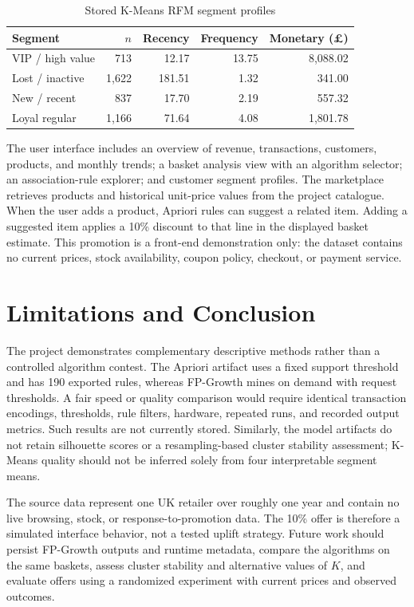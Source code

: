 \documentclass[10pt,conference]{IEEEtran}
\begin{document}
\begin{table}[t]
\centering
\caption{Stored K-Means RFM segment profiles}
\label{tab:segments}
\small
\begin{tabular}{lrrrr}
\toprule
Segment & $n$ & Recency & Frequency & Monetary (\pounds)\\
\midrule
VIP / high value & 713 & 12.17 & 13.75 & 8,088.02\\
Lost / inactive & 1,622 & 181.51 & 1.32 & 341.00\\
New / recent & 837 & 17.70 & 2.19 & 557.32\\
Loyal regular & 1,166 & 71.64 & 4.08 & 1,801.78\\
\bottomrule
\end{tabular}
\end{table}

The user interface includes an overview of revenue, transactions, customers, products, and monthly trends; a basket analysis view with an algorithm selector; an association-rule explorer; and customer segment profiles. The marketplace retrieves products and historical unit-price values from the project catalogue. When the user adds a product, Apriori rules can suggest a related item. Adding a suggested item applies a 10\% discount to that line in the displayed basket estimate. This promotion is a front-end demonstration only: the dataset contains no current prices, stock availability, coupon policy, checkout, or payment service.

\section{Limitations and Conclusion}
The project demonstrates complementary descriptive methods rather than a controlled algorithm contest. The Apriori artifact uses a fixed support threshold and has 190 exported rules, whereas FP-Growth mines on demand with request thresholds. A fair speed or quality comparison would require identical transaction encodings, thresholds, rule filters, hardware, repeated runs, and recorded output metrics. Such results are not currently stored. Similarly, the model artifacts do not retain silhouette scores or a resampling-based cluster stability assessment; K-Means quality should not be inferred solely from four interpretable segment means.

The source data represent one UK retailer over roughly one year and contain no live browsing, stock, or response-to-promotion data. The 10\% offer is therefore a simulated interface behavior, not a tested uplift strategy. Future work should persist FP-Growth outputs and runtime metadata, compare the algorithms on the same baskets, assess cluster stability and alternative values of $K$, and evaluate offers using a randomized experiment with current prices and observed outcomes.
\end{document}
